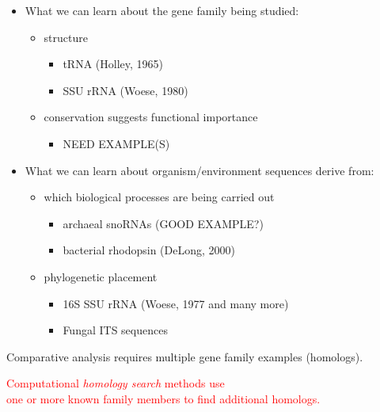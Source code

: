 \documentclass[landscape]{slides}
\begin{document}
\begin{slide}


\small
\begin{center}

\begin{itemize}
\item What we can learn about the gene family being studied:
  \begin{itemize}
  \item structure
    \begin{itemize}
    \item tRNA (Holley, 1965)
    \item SSU rRNA (Woese, 1980)
    \end{itemize}
  \item conservation suggests functional importance
    \begin{itemize}
    \item NEED EXAMPLE(S)
    \end{itemize}
  \end{itemize}
  
\item What we can learn about organism/environment sequences derive
  from:
  \begin{itemize}
  \item which biological processes are being carried out
    \begin{itemize}
    \item archaeal snoRNAs (GOOD EXAMPLE?)
    \item bacterial rhodopsin (DeLong, 2000)
    \end{itemize}
  \item phylogenetic placement
    \begin{itemize}
    \item 16S SSU rRNA (Woese, 1977 and many more)
    \item Fungal ITS sequences
    \end{itemize}
  \end{itemize}
\end{itemize}

\normalsize    
Comparative analysis requires multiple gene family examples
(homologs).

\textcolor{red}{Computational \emph{homology search} methods use \\ one or more known
family members to find additional homologs.}
\end{center}

\vfill
\end{slide}
\end{document}
